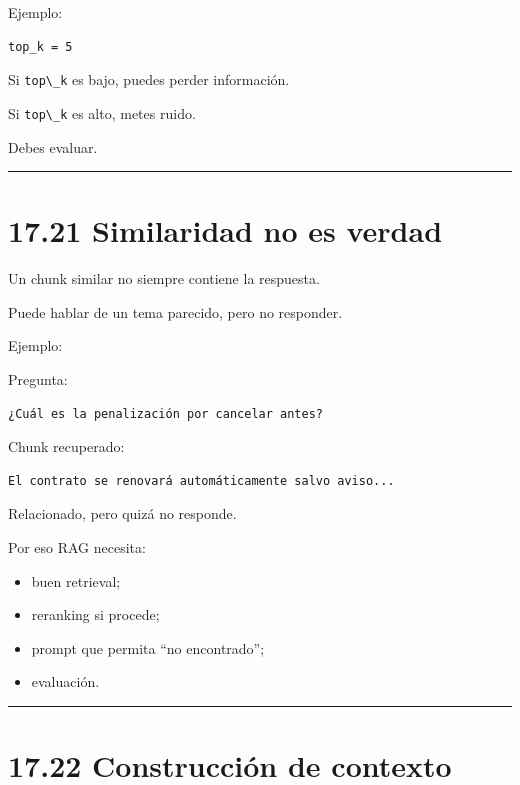 Ejemplo:

\begin{lstlisting}
top_k = 5
\end{lstlisting}

Si \passthrough{\lstinline!top\_k!} es bajo, puedes perder información.

Si \passthrough{\lstinline!top\_k!} es alto, metes ruido.

Debes evaluar.

\begin{center}\rule{0.5\linewidth}{0.5pt}\end{center}

\section{17.21 Similaridad no es verdad}\label{similaridad-no-es-verdad}

Un chunk similar no siempre contiene la respuesta.

Puede hablar de un tema parecido, pero no responder.

Ejemplo:

Pregunta:

\begin{lstlisting}
¿Cuál es la penalización por cancelar antes?
\end{lstlisting}

Chunk recuperado:

\begin{lstlisting}
El contrato se renovará automáticamente salvo aviso...
\end{lstlisting}

Relacionado, pero quizá no responde.

Por eso RAG necesita:

\begin{itemize}
\tightlist
\item
  buen retrieval;
\item
  reranking si procede;
\item
  prompt que permita ``no encontrado'';
\item
  evaluación.
\end{itemize}

\begin{center}\rule{0.5\linewidth}{0.5pt}\end{center}

\section{17.22 Construcción de
contexto}\label{construcciuxf3n-de-contexto}

